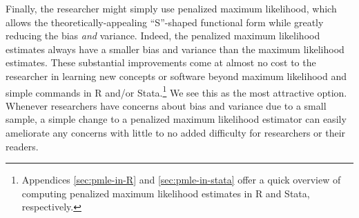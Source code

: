 \documentclass[12pt]{article}
\begin{document}
Finally, the researcher might simply use penalized maximum likelihood, which allows the theoretically-appealing ``S''-shaped functional form while greatly reducing the bias \textit{and} variance.
Indeed, the penalized maximum likelihood estimates always have a smaller bias and variance than the maximum likelihood estimates.
These substantial improvements come at almost no cost to the researcher in learning new concepts or software beyond maximum likelihood and simple commands in R and/or Stata.\footnote{Appendices \ref{sec:pmle-in-R} and \ref{sec:pmle-in-stata} offer a quick overview of computing penalized maximum likelihood estimates in R and Stata, respectively.}
We see this as the most attractive option.
Whenever researchers have concerns about bias and variance due to a small sample, a simple change to a penalized maximum likelihood estimator can easily ameliorate any concerns with little to no added difficulty for researchers or their readers.

\singlespace
\normalsize


%
\end{document}
